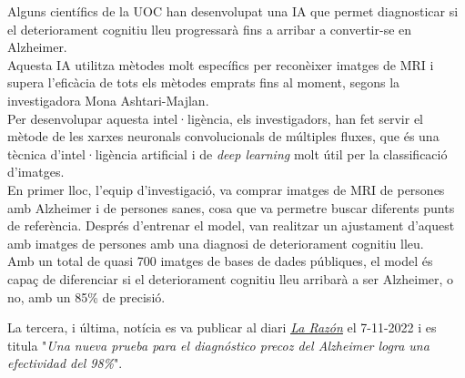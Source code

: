 \documentclass[a4paper,12pt]{report}
\begin{document}
\begin{center}
    \begin{minipage}{0.9\linewidth}
        \vspace{5pt}
        {\small
            Alguns científics de la UOC han desenvolupat una IA que permet diagnosticar si el deteriorament cognitiu lleu progressarà fins a arribar a convertir-se en Alzheimer.\\
            Aquesta IA utilitza mètodes molt específics per reconèixer imatges de MRI i supera l'eficàcia de tots els mètodes emprats fins al moment, segons la investigadora Mona Ashtari-Majlan.\\
            Per desenvolupar aquesta intel·ligència, els investigadors, han fet servir el mètode de les xarxes neuronals convolucionals de múltiples fluxes, que és una tècnica d'intel·ligència artificial i de \textit{deep learning} molt útil per la classificació d'imatges.\\
            En primer lloc, l'equip d'investigació, va comprar imatges de MRI de persones amb Alzheimer i de persones sanes, cosa que va permetre buscar diferents punts de referència. Després d'entrenar el model, van realitzar un ajustament d'aquest amb imatges de persones amb una diagnosi de deteriorament cognitiu lleu.\\
            Amb un total de quasi 700 imatges de bases de dades públiques, el model és capaç de diferenciar si el deteriorament cognitiu lleu arribarà a ser Alzheimer, o no, amb un 85\% de precisió.
        }
        \vspace{5pt}
    \end{minipage}
\end{center}
\newpage
La tercera, i última, notícia es va publicar al diari \href{https://www.larazon.es/sociedad/20220620/ajwe2fywxzgnta7zt4godk4bae.html}{\underline{\textit{La Razón}}} el 7-11-2022 i es titula "\textit{Una nueva prueba para el diagnóstico precoz del Alzheimer logra una efectividad del 98\%}".
\end{document}

